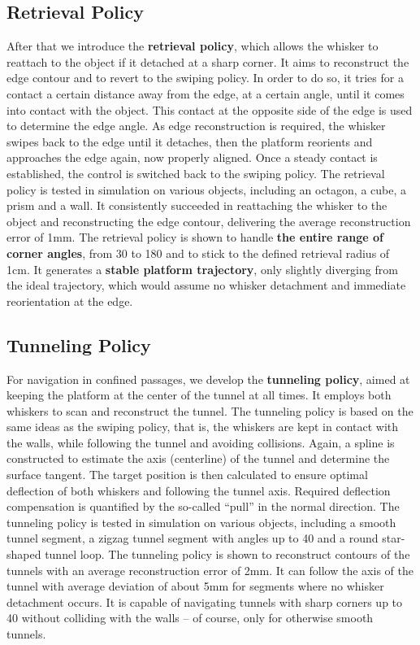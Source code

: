 \subsection{Retrieval Policy}
After that we introduce the \textbf{retrieval policy}, which allows the whisker to reattach to the object if it detached at a sharp corner.
It aims to reconstruct the edge contour and to revert to the swiping policy.
In order to do so, it tries for a contact a certain distance away from the edge, at a certain angle, until it comes into contact with the object.
This contact at the opposite side of the edge is used to determine the edge angle.
As edge reconstruction is required, the whisker swipes back to the edge until it detaches, then the platform reorients and approaches the edge again, now properly aligned.
Once a steady contact is established, the control is switched back to the swiping policy.
The retrieval policy is tested in simulation on various objects, including an octagon, a cube, a prism and a wall.
It consistently succeeded in reattaching the whisker to the object and reconstructing the edge contour, delivering the average reconstruction error of 1mm.
The retrieval policy is shown to handle \textbf{the entire range of corner angles}, from 30\degree{} to 180\degree{} and to stick to the defined retrieval radius of 1cm.
It generates a \textbf{stable platform trajectory}, only slightly diverging from the ideal trajectory, which would assume no whisker detachment and immediate reorientation at the edge.

\subsection{Tunneling Policy}
For navigation in confined passages, we develop the \textbf{tunneling policy}, aimed at keeping the platform at the center of the tunnel at all times.
It employs both whiskers to scan and reconstruct the tunnel.
The tunneling policy is based on the same ideas as the swiping policy, that is, the whiskers are kept in contact with the walls, while following the tunnel and avoiding collisions.
Again, a spline is constructed to estimate the axis (centerline) of the tunnel and determine the surface tangent.
The target position is then calculated to ensure optimal deflection of both whiskers and following the tunnel axis.
Required deflection compensation is quantified by the so-called \enquote{pull} in the normal direction.
The tunneling policy is tested in simulation on various objects, including a smooth tunnel segment, a zigzag tunnel segment with angles up to 40\degree{} and a round star-shaped tunnel loop.
The tunneling policy is shown to reconstruct contours of the tunnels with an average reconstruction error of 2mm.
It can follow the axis of the tunnel with average deviation of about 5mm for segments where no whisker detachment occurs.
It is capable of navigating tunnels with sharp corners up to 40\degree{} without colliding with the walls -- of course, only for otherwise smooth tunnels.

